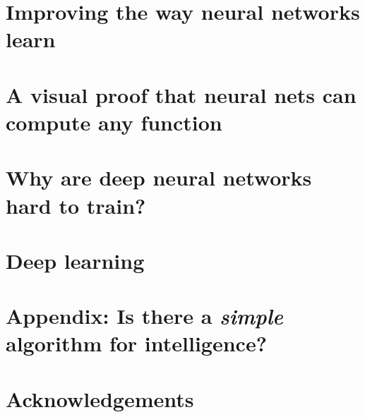 \documentclass[11pt,a4paper,oneside,openany]{book}
\begin{document}
\chapter{Improving the way neural networks learn}


\chapter{A visual proof that neural nets can compute any function}


\chapter{Why are deep neural networks hard to train?}


\chapter{Deep learning}


\chapter*{Appendix: Is there a \emph{simple} algorithm for intelligence?}
{}


\chapter*{Acknowledgements}
{}

\end{document}
